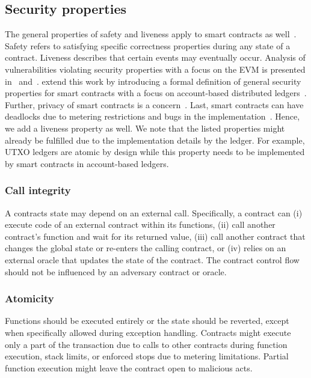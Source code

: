 \subsection{Security properties}
The general properties of safety and liveness apply to smart contracts as well~\cite{Sergey2018}.
Safety refers to satisfying specific correctness properties during any state of a contract.
Liveness describes that certain events may eventually occur.
Analysis of vulnerabilities violating security properties with a focus on the EVM is presented in~\cite{Luu2016} and~\cite{Atzei2017}.
\citeauthor{Grishchenko2018} extend this work by introducing a formal definition of general security properties for smart contracts with a focus on account-based distributed ledgers~\cite{Grishchenko2018}.
Further, privacy of smart contracts is a concern~\cite{Kosba2015,Bowe2018,Covaci2018}.
Last, smart contracts can have deadlocks due to metering restrictions and bugs in the implementation~\cite{Grech2018}.
Hence, we add a liveness property as well.
We note that the listed properties might already be fulfilled due to the implementation details by the ledger. 
For example, UTXO ledgers are atomic by design while this property needs to be implemented by smart contracts in account-based ledgers.

\subsubsection{Call integrity}
A contracts state may depend on an external call. Specifically, a contract can (i) execute code of an external contract within its functions, (ii) call another contract's function and wait for its returned value, (iii) call another contract that changes the global state or re-enters the calling contract, or (iv) relies on an external oracle that updates the state of the contract.
The contract control flow should not be influenced by an adversary contract or oracle.

\subsubsection{Atomicity}
Functions should be executed entirely or the state should be reverted, except when specifically allowed during exception handling.
Contracts might execute only a part of the transaction due to calls to other contracts during function execution, stack limits, or enforced stops due to metering limitations.
Partial function execution might leave the contract open to malicious acts.

